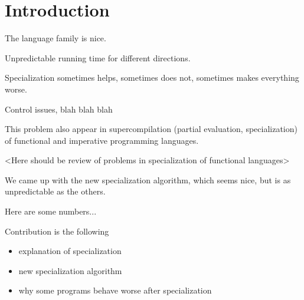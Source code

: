 \section{Introduction}

The \mk{} language family is nice.

Unpredictable running time for different directions.

Specialization sometimes helps, sometimes does not, sometimes makes everything worse.

Control issues, blah blah blah

This problem also appear in supercompilation (partial evaluation, specialization) of functional and imperative programming languages.

<Here should be review of problems in specialization of functional languages>


We came up with the new specialization algorithm, which seems nice, but is as unpredictable as the others.

Here are some numbers...

Contribution is the following
\begin{itemize}
  \item explanation of specialization
  \item new specialization algorithm
  \item why some programs behave worse after specialization
\end{itemize}